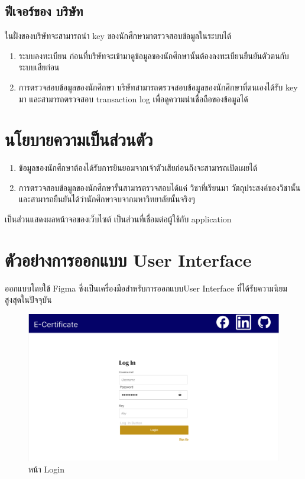 \subsection{ฟีเจอร์ของ บริษัท}
\enskip \enskip \enskip \enskip \enskip 
ในฝั่งของบริษัทจะสามารถนำ key ของนักศึกษามาตรวจสอบข้อมูลในระบบได้
\begin{enumerate}
  \item ระบบลงทะเบียน ก่อนที่บริษัทจะเข้ามาดูข้อมูลของนักศึกษานั้นต้องลงทะเบียนยืนยันตัวตนกับระบบเสียก่อน
  \item การตรวจสอบข้อมูลของนักศึกษา บริษัทสามารถตรวจสอบข้อมูลของนักศึกษาที่ตนเองได้รับ key มา และสามารถตรวจสอบ transaction log เพื่อดูความน่าเชื่อถือของข้อมูลได้
  \end{enumerate}
\section{นโยบายความเป็นส่วนตัว}
\begin{enumerate}
  \item ข้อมูลของนักศึกษาต้องได้รับการยินยอมจากเจ้าตัวเสียก่อนถึงจะสามารถเปิดเผยได้
  \item การตรวจสอบข้อมูลของนักศึกษารั้นสามารตรวจสอบได้แค่ วิชาที่เรียนมา วัตถุประสงค์ของวิชานั้น และสามารถยืนยันได้ว่านักศึกษาจบจากมหาวิทยาลัยนั้นจริงๆ
  \end{enumerate}
\enskip \enskip \enskip \enskip \enskip 
เป็นส่วนแสดงผลหน้าจอของเว็บไซต์ เป็นส่วนที่เชื่อมต่อผู้ใช้กับ application


\section{ตัวอย่างการออกแบบ User Interface}
\enskip \enskip \enskip \enskip \enskip 
ออกแบบโดยใข้ Figma ซึ่งเป็นเครื่องมือสำหรับการออกแบบUser Interface ที่ได้รับความนิยมสูงสุดในปัจจุบัน

\graphicspath{ {./images/} }
\begin{figure}[htbp]
  \centering 
  \includegraphics[scale=0.5]{figmalogin.png}
  \caption[Peers Diagram 5]{หน้า Login}
  \label{fig:login}
\end{figure}

